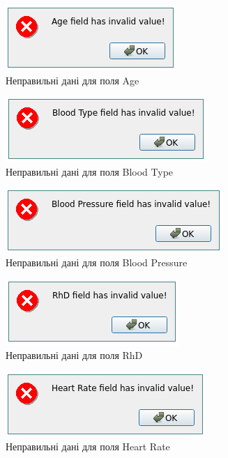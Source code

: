 \documentclass[oneside,14pt]{extarticle}
\begin{document}
\begin{figure}[H]
	\centering
	\includegraphics[scale=1]{15}
	\caption{Неправильні дані для поля Age}
\end{figure}

\begin{figure}[H]
	\centering
	\includegraphics[scale=1]{16}
	\caption{Неправильні дані для поля Blood Type}
\end{figure}

\begin{figure}[H]
	\centering
	\includegraphics[scale=1]{17}
	\caption{Неправильні дані для поля Blood Pressure}
\end{figure}

\begin{figure}[H]
	\centering
	\includegraphics[scale=1]{18}
	\caption{Неправильні дані для поля RhD}
\end{figure}

\begin{figure}[H]
	\centering
	\includegraphics[scale=1]{19}
	\caption{Неправильні дані для поля Heart Rate}
\end{figure}
\end{document}
